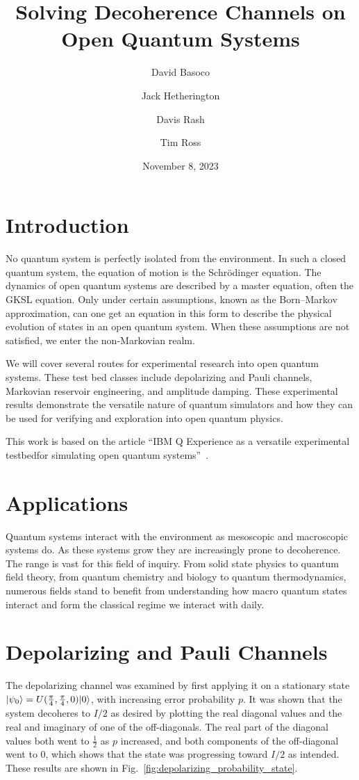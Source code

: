 \documentclass[12pt]{article}
\title{Solving Decoherence Channels on Open Quantum Systems}
\author{David Basoco \and Jack Hetherington \and Davis Rash \and Tim Ross}
\date{November 8, 2023}
\DeclarePairedDelimiter{\ket}{\lvert}{\rangle}
\begin{document}
  \maketitle

  \section{Introduction}

  No quantum system is perfectly isolated from the environment. In such a closed quantum system, the equation of motion is the Schr\"{o}dinger equation. The dynamics of open quantum systems are described by a master equation, often the GKSL equation. Only under certain assumptions, known as the Born--Markov approximation, can one get an equation in this form to describe the physical evolution of states in an open quantum system. When these assumptions are not satisfied, we enter the non-Markovian realm.

  We will cover several routes for experimental research into open quantum systems. These test bed classes include depolarizing and Pauli channels, Markovian reservoir engineering, and amplitude damping. These experimental results demonstrate the versatile nature of quantum simulators and how they can be used for verifying and exploration into open quantum physics.

  This work is based on the article ``IBM Q Experience as a versatile experimental testbedfor simulating open quantum systems''~\cite{openQuantumSystems}.


  \section{Applications}

  Quantum systems interact with the environment as mesoscopic and macroscopic systems do. As these systems grow they are increasingly prone to decoherence. The range is vast for this field of inquiry. From solid state physics to quantum field theory, from quantum chemistry and biology to quantum thermodynamics, numerous fields stand to benefit from understanding how macro quantum states interact and form the classical regime we interact with daily.


  \section{Depolarizing and Pauli Channels}

  The depolarizing channel was examined by first applying it on a stationary state \( \ket{\psi_{0}} = U(\frac{\pi}{4}, \frac{\pi}{4}, 0) \ket{0} \), with increasing error probability \( p \). It was shown that the system decoheres to \( I / 2 \) as desired by plotting the real diagonal values and the real and imaginary of one of the off-diagonals. The real part of the diagonal values both went to \( \frac{1}{2} \) as \( p \) increased, and both components of the off-diagonal went to \( 0 \), which shows that the state was progressing toward \( I / 2 \) as intended. These results are shown in Fig.~\ref{fig:depolarizing_probability_state}.
\end{document}
